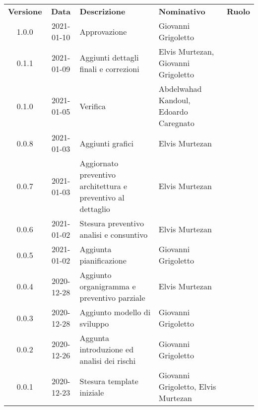 {
    \renewcommand{\arraystretch}{1.5}
    \centering
    \begin{longtable}{ c c  C{3.5cm}  C{3.5cm}  c }
        \rowcolor{\primaryColor}
        \textcolor{\secondaryColor}{
        \textbf{Versione}}     & \textcolor{\secondaryColor}{\textbf{Data}}       & \textcolor{\secondaryColor}
        {\textbf{Descrizione}} & \textcolor{\secondaryColor}{\textbf{Nominativo}} & \textcolor{\secondaryColor}{\textbf{Ruolo}}                          \\


        1.0.0  & 
        2021-01-10  & 
        Approvazione & 
        Giovanni Grigoletto & 
        \responsabile{} \\

        0.1.1  & 
        2021-01-09 & 
        Aggiunti dettagli finali e correzioni & 
        Elvis Murtezan, Giovanni Grigoletto  & 
        \redattore{} \\

        0.1.0  & 
        2021-01-05 & 
        Verifica & 
        Abdelwahad Kandoul, Edoardo Caregnato  & 
        \verificatore{} \\

        0.0.8  & 
        2021-01-03 & 
        Aggiunti grafici & 
        Elvis Murtezan  & 
        \redattore{} \\

        0.0.7  & 
        2021-01-03 & 
        Aggiornato preventivo architettura e preventivo al dettaglio & 
        Elvis Murtezan  & 
        \redattore{} \\

        0.0.6  & 
        2021-01-02 & 
        Stesura preventivo analisi e consuntivo & 
        Elvis Murtezan  & 
        \redattore{} \\

        0.0.5  & 
        2021-01-02 & 
        Aggiunta pianificazione & 
        Giovanni Grigoletto & 
        \redattore{} \\

        0.0.4  & 
        2020-12-28 & 
        Aggiunto organigramma e preventivo parziale & 
        Elvis Murtezan  & 
        \redattore{} \\

        0.0.3  & 
        2020-12-28 & 
        Aggiunto modello di sviluppo & 
        Giovanni Grigoletto & 
        \redattore{} \\
        
        0.0.2  & 
        2020-12-26 & 
        Aggunta introduzione ed analisi dei rischi & 
        Giovanni Grigoletto & 
        \redattore{} \\

        0.0.1  & 
        2020-12-23 & 
        Stesura template iniziale & 
        Giovanni Grigoletto, Elvis Murtezan & 
        \redattore{} \\
    \end{longtable}
}